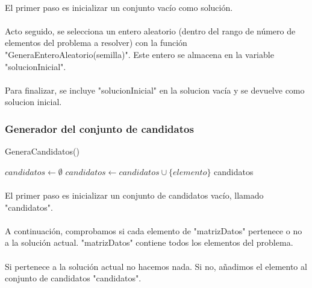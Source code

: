 \documentclass{article}
\begin{document}
		\paragraph{}El primer paso es inicializar un conjunto vacío como solución.
			
		\paragraph{}Acto seguido, se selecciona un entero aleatorio (dentro del rango de número de elementos del problema a resolver) con la función "GeneraEnteroAleatorio(semilla)". Este entero se almacena en la variable "solucionInicial".
		
		\paragraph{}Para finalizar, se incluye "solucionInicial" en la solucion vacía y se devuelve como solucion inicial.

	\subsubsection{Generador del conjunto de candidatos}
	\begin{algorithm}[H]
		\caption{GeneraCandidatos()}
		\begin{algorithmic}
			\STATE $candidatos \leftarrow \emptyset$
			\STATE $candidatos \leftarrow candidatos \cup \{elemento\}$
			\ENDIF
			\ENDFOR
			\RETURN candidatos
		\end{algorithmic}
	\end{algorithm}

	\paragraph{}El primer paso es inicializar un conjunto de candidatos vacío, llamado "candidatos".
	
	\paragraph{}A continuación, comprobamos si cada elemento de "matrizDatos" pertenece o no a la solución actual. "matrizDatos" contiene todos los elementos del problema.
	
	\paragraph{}Si pertenece a la solución actual no hacemos nada. Si no, añadimos el elemento al conjunto de candidatos "candidatos".
	
\end{document}
